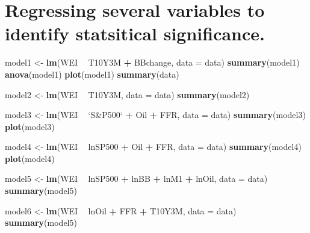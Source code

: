\documentclass[]{article}
\newenvironment{Shaded}{\begin{snugshade}}{\end{snugshade}}
\newcommand{\KeywordTok}[1]{\textcolor[rgb]{0.13,0.29,0.53}{\textbf{#1}}}
\newcommand{\DataTypeTok}[1]{\textcolor[rgb]{0.13,0.29,0.53}{#1}}
\newcommand{\StringTok}[1]{\textcolor[rgb]{0.31,0.60,0.02}{#1}}
\newcommand{\OperatorTok}[1]{\textcolor[rgb]{0.81,0.36,0.00}{\textbf{#1}}}
\newcommand{\NormalTok}[1]{#1}
\begin{document}
\section{Regressing several variables to identify statsitical
significance.}\label{regressing-several-variables-to-identify-statsitical-significance.}

\begin{Shaded}
\begin{Highlighting}[]
\NormalTok{model1 <-}\StringTok{ }\KeywordTok{lm}\NormalTok{(WEI }\OperatorTok{~}\StringTok{ }\NormalTok{T10Y3M }\OperatorTok{+}\StringTok{ }\NormalTok{BBchange, }\DataTypeTok{data =}\NormalTok{ data)}
\KeywordTok{summary}\NormalTok{(model1)}
\KeywordTok{anova}\NormalTok{(model1)}
\KeywordTok{plot}\NormalTok{(model1)}
\KeywordTok{summary}\NormalTok{(data)}

\NormalTok{model2 <-}\StringTok{ }\KeywordTok{lm}\NormalTok{(WEI }\OperatorTok{~}\StringTok{ }\NormalTok{T10Y3M, }\DataTypeTok{data =}\NormalTok{ data)}
\KeywordTok{summary}\NormalTok{(model2)}

\NormalTok{model3 <-}\StringTok{ }\KeywordTok{lm}\NormalTok{(WEI }\OperatorTok{~}\StringTok{ `}\DataTypeTok{S&P500}\StringTok{`} \OperatorTok{+}\StringTok{ }\NormalTok{Oil }\OperatorTok{+}\StringTok{ }\NormalTok{FFR, }\DataTypeTok{data =}\NormalTok{ data)}
\KeywordTok{summary}\NormalTok{(model3)}
\KeywordTok{plot}\NormalTok{(model3)}

\NormalTok{model4 <-}\StringTok{ }\KeywordTok{lm}\NormalTok{(WEI }\OperatorTok{~}\StringTok{ }\NormalTok{lnSP500 }\OperatorTok{+}\StringTok{ }\NormalTok{Oil }\OperatorTok{+}\StringTok{ }\NormalTok{FFR, }\DataTypeTok{data =}\NormalTok{ data)}
\KeywordTok{summary}\NormalTok{(model4)}
\KeywordTok{plot}\NormalTok{(model4)}

\NormalTok{model5 <-}\StringTok{ }\KeywordTok{lm}\NormalTok{(WEI }\OperatorTok{~}\StringTok{ }\NormalTok{lnSP500 }\OperatorTok{+}\StringTok{ }\NormalTok{lnBB }\OperatorTok{+}\StringTok{ }\NormalTok{lnM1 }\OperatorTok{+}\StringTok{ }\NormalTok{lnOil, }\DataTypeTok{data =}\NormalTok{ data)}
\KeywordTok{summary}\NormalTok{(model5)}


\NormalTok{model6 <-}\StringTok{ }\KeywordTok{lm}\NormalTok{(WEI }\OperatorTok{~}\StringTok{ }\NormalTok{lnOil }\OperatorTok{+}\StringTok{ }\NormalTok{FFR }\OperatorTok{+}\StringTok{ }\NormalTok{T10Y3M, }\DataTypeTok{data =}\NormalTok{ data)}
\KeywordTok{summary}\NormalTok{(model5)}
\end{Highlighting}
\end{Shaded}
\end{document}
